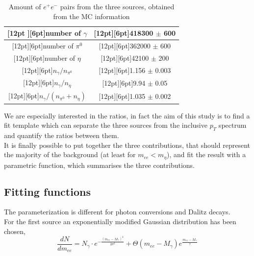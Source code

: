 \documentclass[a4paper,twocolumn,gsifonts,twoside]{gsipaper}
\begin{document}
\begin{table}[htb]
\center
\caption{Amount of $e^{+}e^{-}$ pairs from the three sources, obtained from the MC information}\label{amount_MC}
\begin{tabular}{|c|c|}
  \hline
  \raisebox{0pt}[12pt ][6pt]{number of $\gamma$} &
  \raisebox{0pt}[12pt][6pt]{418300 $\pm$ 600} \\
  \hline
  \raisebox{0pt}[12pt][6pt]{number of $\pi^{0}$} &
  \raisebox{0pt}[12pt][6pt]{362000 $\pm$ 600} \\
  \hline
  \raisebox{0pt}[12pt][6pt]{number of $\eta$} &
  \raisebox{0pt}[12pt][6pt]{42100 $\pm$ 200} \\
  \hline
  \raisebox{0pt}[12pt][6pt]{$n_{\gamma}/ n_{\pi^{0}}$} &
  \raisebox{0pt}[12pt][6pt]{1.156 $\pm$ 0.003} \\
  \hline
  \raisebox{0pt}[12pt][6pt]{$n_{\gamma}/ n_{\eta}$} &
  \raisebox{0pt}[12pt][6pt]{9.94 $\pm$ 0.05} \\
  \hline
  \raisebox{0pt}[12pt][6pt]{$n_{\gamma}/(n_{\pi^{0}}+n_{\eta})$} &
  \raisebox{0pt}[12pt][6pt]{1.035 $\pm$ 0.002} \\
  \hline
  \end{tabular}
\end{table}

We are especially interested in the ratios, in fact the aim of this study is to find a fit template which can separate the three sources 
from the inclusive $p_{T}$ spectrum and quantify the ratios between them.\\

It is finally possible to put together the three contributions, that should represent the majority of the background (at least for 
$m_{ee} < m_{\eta}$), and fit the result with a parametric function, which summarises the three contributions.

\subsection{Fitting functions}

The parameterization is different for photon conversions and Dalitz decays.\\
For the first source an exponentially modified Gaussian distribution has been chosen, 
\vspace{0.2cm}
\begin{equation}
\frac{dN}{dm_{ee}}=N_{\gamma}\cdot e^{-\frac{(m_{ee}-M_{\gamma})^{2}}{2\sigma^{2}}}+\Theta(m_{ee}-M_{\gamma})
e^{\frac{m_{ee}-M_{\gamma}}{\tau}}
\label{gaussexp}
\end{equation}
\vspace{0.2cm}
\end{document}
